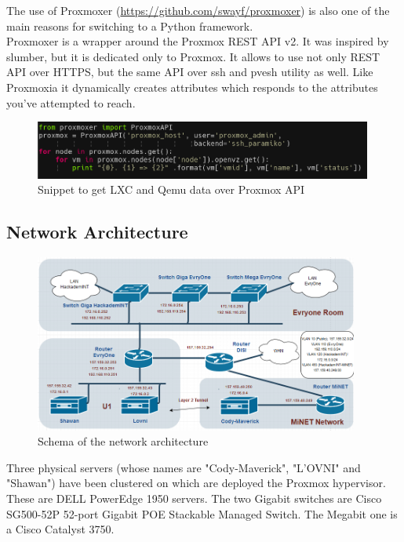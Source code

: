 The use of Proxmoxer (\url{https://github.com/swayf/proxmoxer}) is also one of the main reasons for switching to a Python framework.
\\

Proxmoxer is a wrapper around the Proxmox REST API v2.
It was inspired by slumber, but it is dedicated only to Proxmox. It allows to use not only REST API over HTTPS, but the same API over ssh and pvesh utility as well.
Like Proxmoxia it dynamically creates attributes which responds to the attributes you've attempted to reach.

\begin{figure}[!h]
  \centering
  \includegraphics[width=0.99\textwidth]{images/proxmoxer.png}
  \caption{Snippet to get LXC and Qemu data over Proxmox API}
  \label{Proxmoxer}
\end{figure}

\pagebreak

\subsection{Network Architecture}

\vspace{2cm}

\begin{figure}[!h]
  \centering
  \includegraphics[width=0.95\textwidth]{images/reseau.png}
  \caption{Schema of the network architecture}
  \label{Proxmoxer}
\end{figure}

Three physical servers (whose names are "Cody-Maverick", "L'OVNI" and "Shawan") have been clustered on which are deployed the Proxmox hypervisor. These are DELL PowerEdge 1950 servers. The two Gigabit switches are Cisco SG500-52P 52-port Gigabit POE Stackable Managed Switch. The Megabit one is a Cisco Catalyst 3750.

